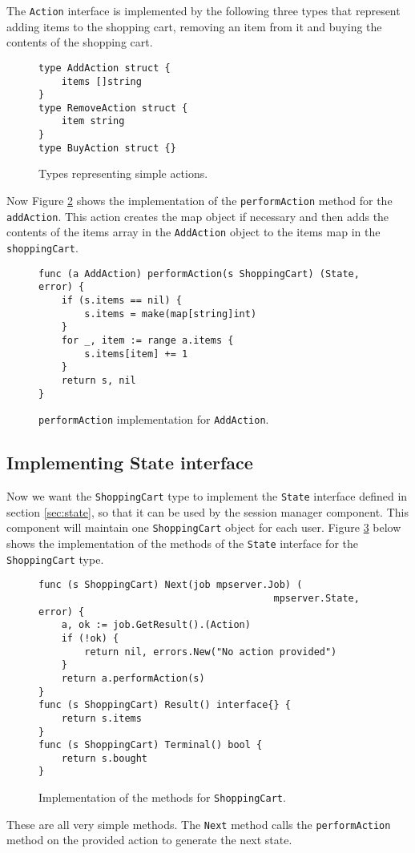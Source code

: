 The \texttt{Action} interface is implemented by the following three types
that represent adding items to the shopping cart, removing an item from it
and buying the contents of the shopping cart.
\begin{figure}[h]
\begin{lstlisting}
type AddAction struct {
    items []string
}
type RemoveAction struct {
    item string
}
type BuyAction struct {}
\end{lstlisting}
\caption[scale=1.0]{Types representing simple actions.}
\label{fig:actions}
\end{figure}

Now Figure \ref{fig:addAction} shows the implementation of the \texttt{performAction}
method for the \texttt{addAction}. This action creates the map object if 
necessary and then adds the contents of the items array in the \texttt{AddAction}
object to the items map in the \texttt{shoppingCart}.
\begin{figure}[h]
\begin{lstlisting}
func (a AddAction) performAction(s ShoppingCart) (State, error) {
    if (s.items == nil) {
        s.items = make(map[string]int)
    }
    for _, item := range a.items {
        s.items[item] += 1
    }
    return s, nil
}
\end{lstlisting}
\caption[scale=1.0]{\texttt{performAction} implementation for \texttt{AddAction}.}
\label{fig:addAction}
\end{figure}

\subsection{Implementing State interface}
Now we want the \texttt{ShoppingCart} type to implement the \texttt{State} 
interface defined in section
\ref{sec:state}, so that it can be used by the session manager component.
This component will maintain one \texttt{ShoppingCart} object for each user.
Figure \ref{fig:shoppingCartImpl} below shows the implementation of the 
methods of the \texttt{State} interface for the \texttt{ShoppingCart} type.
\begin{figure}[h]
\begin{lstlisting}
func (s ShoppingCart) Next(job mpserver.Job) (
                                         mpserver.State, error) {
    a, ok := job.GetResult().(Action)
    if (!ok) {
        return nil, errors.New("No action provided")
    }
    return a.performAction(s)
}
func (s ShoppingCart) Result() interface{} {
    return s.items
}
func (s ShoppingCart) Terminal() bool {
    return s.bought
}
\end{lstlisting}
\caption[scale=1.0]{Implementation of the methods for \texttt{ShoppingCart}.}
\label{fig:shoppingCartImpl}
\end{figure}
These are all very simple methods. The \texttt{Next} method calls 
the \texttt{performAction} method on the provided action to generate 
the next state.

